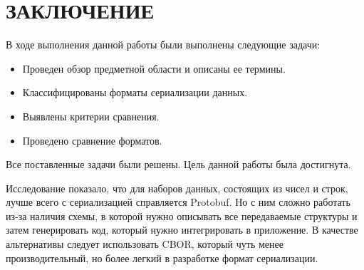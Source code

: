 \chapter*{ЗАКЛЮЧЕНИЕ}

В ходе выполнения данной работы были выполнены следующие задачи:
\begin{itemize}
\item Проведен обзор предметной области и описаны ее термины.
\item Классифицированы форматы сериализации данных.
\item Выявлены критерии сравнения.
\item Проведено сравнение форматов.
\end{itemize}
 
Все поставленные задачи были решены. Цель данной работы была достигнута.

Исследование показало, что для наборов данных, состоящих из чисел и строк, лучше всего с сериализацией справляется Protobuf. Но с ним сложно работать из-за наличия схемы, в которой нужно описывать все передаваемые структуры и затем генерировать код, который нужно интегрировать в приложение.
В качестве альтернативы следует использовать CBOR, который чуть менее производительный, но более легкий в разработке формат сериализации.  

